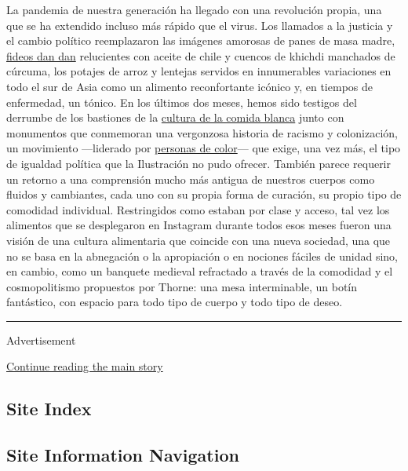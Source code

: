 La pandemia de nuestra generación ha llegado con una revolución propia,
una que se ha extendido incluso más rápido que el virus. Los llamados a
la justicia y el cambio político reemplazaron las imágenes amorosas de
panes de masa madre,
\href{https://cooking.nytimes.com/recipes/7002-dan-dan-noodles}{fideos
dan dan} relucientes con aceite de chile y cuencos de khichdi manchados
de cúrcuma, los potajes de arroz y lentejas servidos en innumerables
variaciones en todo el sur de Asia como un alimento reconfortante
icónico y, en tiempos de enfermedad, un tónico. En los últimos dos
meses, hemos sido testigos del derrumbe de los bastiones de la
\href{https://www.nytimes.com/2020/06/29/dining/john-t-edge-southern-foodways-alliance.html}{cultura
de la comida blanca} junto con monumentos que conmemoran una vergonzosa
historia de racismo y colonización, un movimiento ---liderado por
\href{https://www.nytimes.com/es/2020/06/16/espanol/mundo/bipoc-que-es.html}{personas
de color}--- que exige, una vez más, el tipo de igualdad política que la
Ilustración no pudo ofrecer. También parece requerir un retorno a una
comprensión mucho más antigua de nuestros cuerpos como fluidos y
cambiantes, cada uno con su propia forma de curación, su propio tipo de
comodidad individual. Restringidos como estaban por clase y acceso, tal
vez los alimentos que se desplegaron en Instagram durante todos esos
meses fueron una visión de una cultura alimentaria que coincide con una
nueva sociedad, una que no se basa en la abnegación o la apropiación o
en nociones fáciles de unidad sino, en cambio, como un banquete medieval
refractado a través de la comodidad y el cosmopolitismo propuestos por
Thorne: una mesa interminable, un botín fantástico, con espacio para
todo tipo de cuerpo y todo tipo de deseo.

\begin{center}\rule{0.5\linewidth}{\linethickness}\end{center}

Advertisement

\protect\hyperlink{after-bottom}{Continue reading the main story}

\hypertarget{site-index}{%
\subsection{Site Index}\label{site-index}}

\hypertarget{site-information-navigation}{%
\subsection{Site Information
Navigation}\label{site-information-navigation}}

